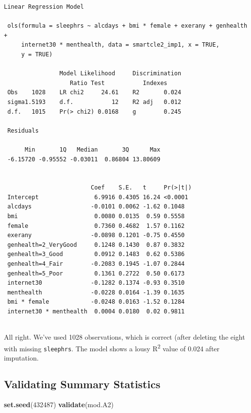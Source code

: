 \documentclass[]{book}
\newenvironment{Shaded}{\begin{snugshade}}{\end{snugshade}}
\newcommand{\KeywordTok}[1]{\textcolor[rgb]{0.13,0.29,0.53}{\textbf{#1}}}
\newcommand{\DecValTok}[1]{\textcolor[rgb]{0.00,0.00,0.81}{#1}}
\newcommand{\NormalTok}[1]{#1}
\theoremstyle{definition}
\theoremstyle{definition}
\theoremstyle{definition}
\theoremstyle{remark}
\begin{document}
\begin{verbatim}
Linear Regression Model
 
 ols(formula = sleephrs ~ alcdays + bmi * female + exerany + genhealth + 
     internet30 * menthealth, data = smartcle2_imp1, x = TRUE, 
     y = TRUE)
 
                Model Likelihood     Discrimination    
                   Ratio Test           Indexes        
 Obs    1028    LR chi2     24.61    R2       0.024    
 sigma1.5193    d.f.           12    R2 adj   0.012    
 d.f.   1015    Pr(> chi2) 0.0168    g        0.245    
 
 Residuals
 
      Min       1Q   Median       3Q      Max 
 -6.15720 -0.95552 -0.03011  0.86804 13.80609 
 
 
                         Coef    S.E.   t     Pr(>|t|)
 Intercept                6.9916 0.4305 16.24 <0.0001 
 alcdays                 -0.0101 0.0062 -1.62 0.1048  
 bmi                      0.0080 0.0135  0.59 0.5558  
 female                   0.7360 0.4682  1.57 0.1162  
 exerany                 -0.0898 0.1201 -0.75 0.4550  
 genhealth=2_VeryGood     0.1248 0.1430  0.87 0.3832  
 genhealth=3_Good         0.0912 0.1483  0.62 0.5386  
 genhealth=4_Fair        -0.2083 0.1945 -1.07 0.2844  
 genhealth=5_Poor         0.1361 0.2722  0.50 0.6173  
 internet30              -0.1282 0.1374 -0.93 0.3510  
 menthealth              -0.0228 0.0164 -1.39 0.1635  
 bmi * female            -0.0248 0.0163 -1.52 0.1284  
 internet30 * menthealth  0.0004 0.0180  0.02 0.9811  
 
\end{verbatim}

All right. We've used 1028 observations, which is correct (after
deleting the eight with missing \texttt{sleephrs}. The model shows a
lousy R\textsuperscript{2} value of 0.024 after imputation.

\subsection{Validating Summary
Statistics}\label{validating-summary-statistics-2}

\begin{Shaded}
\begin{Highlighting}[]
\KeywordTok{set.seed}\NormalTok{(}\DecValTok{432487}\NormalTok{)}
\KeywordTok{validate}\NormalTok{(mod.A2)}
\end{Highlighting}
\end{Shaded}
\end{document}
